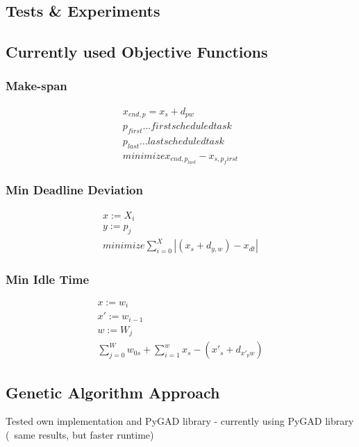 \documentclass[a4paper,12pt,twoside]{scrreprt}
\begin{document}
\begin{flushleft}
\section{Tests \& Experiments}

\subsection{Currently used Objective Functions}

\subsubsection{Make-span}
\begin{equation}
	\label{makespan}
	\begin{split}
		x_{end, p} = x_s + d_{pw} \\
		p_{first} ... first scheduled task \\
		p_{last} ... last scheduled task \\
		minimize x_{end, p_{last}} - x_{s, p_first}
	\end{split}
\end{equation}

\subsubsection{Min Deadline Deviation}
\begin{equation}
	\label{min_deadline_deviation}
	\begin{split}
		x := X_{i} \\
		y := p_{j} \\
		minimize \sum_{i=0}^{X} |(x_{s} + d_{y,w}) - x_{dt}|
	\end{split}
\end{equation}

\subsubsection{Min Idle Time}
\begin{equation}
	\label{min_idle_time}
	\begin{split}
		x := w_{i}\\
		x' := w_{i-1}\\
		w := W_{j} \\
		\sum_{j=0}^{W} w_{0s} + \sum_{i=1}^{w} x_{s} - (x'_{s} + d_{x'_{p}w})
	\end{split}
\end{equation}

\subsection{Genetic Algorithm Approach}
Tested own implementation and PyGAD library - currently using PyGAD library (~same results, but faster runtime)


\end{flushleft}
\end{document}
